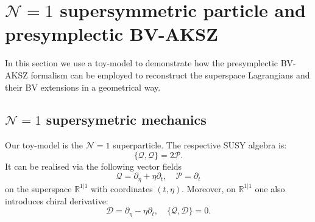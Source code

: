 \documentclass[a4paper,12pt]{article}
\numberwithin{equation}{section} %
\numberwithin{equation}{section}
\newcommand{\D}{\mathcal{D}}
\newcommand{\stheta}{\eta}
\begin{document}

\section{$\mathcal{N}=1$ supersymmetric particle and presymplectic BV-AKSZ}
\label{sec:particle}
In this section we use a toy-model to demonstrate how the presymplectic BV-AKSZ formalism can be employed to reconstruct the superspace Lagrangians and their BV extensions in a geometrical way. 

\subsection{$\mathcal{N}=1$ supersymetric mechanics}
Our toy-model is the  $\mathcal{N}=1$ superparticle. The respective SUSY algebra is:
\begin{equation}
    \{\mathcal{Q}, \mathcal{Q}\} = 2\mathcal{P}.
\end{equation}
It can be realised via the following vector fields 
\begin{equation}
    \mathcal{Q} = \partial_\stheta + \stheta \partial_t, \quad \mathcal{P} = \partial_t
\end{equation}
on the superspace $\mathbb{R}^{1|1}$ with coordinates $(t, \stheta)$. Moreover, on $\mathbb{R}^{1|1}$ one also introduces chiral derivative:
\begin{equation}\label{Chiral derivative}
    \D = \partial_\stheta - \stheta\partial_t, \quad \{\mathcal{Q}, \D\} = 0.
\end{equation}
\end{document}
